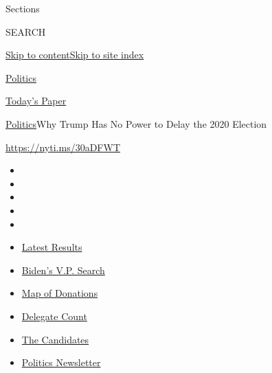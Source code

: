 Sections

SEARCH

\protect\hyperlink{site-content}{Skip to
content}\protect\hyperlink{site-index}{Skip to site index}

\href{https://www.nytimes3xbfgragh.onion/section/politics}{Politics}

\href{https://myaccount.nytimes3xbfgragh.onion/auth/login?response_type=cookie\&client_id=vi}{}

\href{https://www.nytimes3xbfgragh.onion/section/todayspaper}{Today's
Paper}

\href{/section/politics}{Politics}\textbar{}Why Trump Has No Power to
Delay the 2020 Election

\url{https://nyti.ms/30aDFWT}

\begin{itemize}
\item
\item
\item
\item
\item
\end{itemize}

\begin{itemize}
\item
  \href{https://www.nytimes3xbfgragh.onion/interactive/2020/08/04/us/elections/results-arizona-kansas-michigan-missouri-primaries.html?action=click\&pgtype=Article\&state=default\&region=TOP_BANNER\&context=storylines_menu}{Latest
  Results}
\item
  \href{https://www.nytimes3xbfgragh.onion/article/biden-vice-president-2020.html?action=click\&pgtype=Article\&state=default\&region=TOP_BANNER\&context=storylines_menu}{Biden's
  V.P. Search}
\item
  \href{https://www.nytimes3xbfgragh.onion/interactive/2020/07/24/us/politics/trump-biden-campaign-donors.html?action=click\&pgtype=Article\&state=default\&region=TOP_BANNER\&context=storylines_menu}{Map
  of Donations}
\item
  \href{https://www.nytimes3xbfgragh.onion/interactive/2020/us/elections/delegate-count-primary-results.html?action=click\&pgtype=Article\&state=default\&region=TOP_BANNER\&context=storylines_menu}{Delegate
  Count}
\item
  \href{https://www.nytimes3xbfgragh.onion/interactive/2019/us/politics/2020-presidential-candidates.html?action=click\&pgtype=Article\&state=default\&region=TOP_BANNER\&context=storylines_menu}{The
  Candidates}
\item
  \href{https://www.nytimes3xbfgragh.onion/newsletters/politics?action=click\&pgtype=Article\&state=default\&region=TOP_BANNER\&context=storylines_menu}{Politics
  Newsletter}
\end{itemize}

